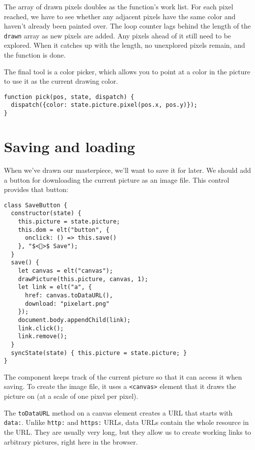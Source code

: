 The array of drawn pixels doubles as the function's work list. For each pixel reached, we have to see whether any adjacent pixels have the same color and haven't already been painted over. The loop counter lags behind the length of the \lstinline`drawn` array as new pixels are added. Any pixels ahead of it still need to be explored. When it catches up with the length, no unexplored pixels remain, and the function is done.

The final tool is a color picker, which allows you to point at a color in the picture to use it as the current drawing color.

\begin{lstlisting}
function pick(pos, state, dispatch) {
  dispatch({color: state.picture.pixel(pos.x, pos.y)});
}
\end{lstlisting}
\noindent

\section{Saving and loading}

When we've drawn our masterpiece, we'll want to save it for later. We should add a button for downloading the current picture as an image file. This control provides that button:

\begin{lstlisting}
class SaveButton {
  constructor(state) {
    this.picture = state.picture;
    this.dom = elt("button", {
      onclick: () => this.save()
    }, "$<💾>$ Save");
  }
  save() {
    let canvas = elt("canvas");
    drawPicture(this.picture, canvas, 1);
    let link = elt("a", {
      href: canvas.toDataURL(),
      download: "pixelart.png"
    });
    document.body.appendChild(link);
    link.click();
    link.remove();
  }
  syncState(state) { this.picture = state.picture; }
}
\end{lstlisting}
\noindent{}

The component keeps track of the current picture so that it can access it when saving. To create the image file, it uses a \lstinline`<canvas>` element that it draws the picture on (at a scale of one pixel per pixel).

The \lstinline`toDataURL` method on a canvas element creates a URL that starts with \lstinline`data:`. Unlike \lstinline`http:` and \lstinline`https:` URLs, data URLs contain the whole resource in the URL. They are usually very long, but they allow us to create working links to arbitrary pictures, right here in the browser.

